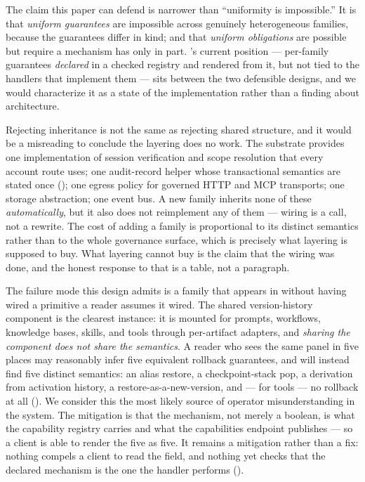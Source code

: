  The claim this paper can defend is narrower than
``uniformity is impossible.'' It is that \emph{uniform guarantees} are impossible
across genuinely heterogeneous families, because the guarantees differ in kind; and
that \emph{uniform obligations} are possible but require a mechanism \sys has only
in part. \sys's current position --- per-family guarantees \emph{declared} in a
checked registry and rendered from it, but not tied to the handlers that implement
them --- sits between the two defensible designs, and we would characterize it as a
state of the implementation rather than a finding about architecture.



 Rejecting inheritance is not the same as
rejecting shared structure, and it would be a misreading to conclude the layering
does no work. The substrate provides one implementation of session verification and
scope resolution that every account route uses; one audit-record helper whose
transactional semantics are stated once (); one egress
policy for governed HTTP and MCP transports; one storage abstraction; one event
bus. A new family inherits none of these \emph{automatically}, but it also does not
reimplement any of them --- wiring is a call, not a rewrite. The cost of adding a
family is proportional to its distinct semantics rather than to the whole
governance surface, which is precisely what layering is supposed to buy. What
layering cannot buy is the claim that the wiring was done, and the honest response
to that is a table, not a paragraph.

 The failure mode this design admits is a family
that appears in \Lfam{} without having wired a primitive a reader assumes it wired.
The shared version-history component is the clearest instance: it is mounted for
prompts, workflows, knowledge bases, skills, and tools through per-artifact
adapters, and \emph{sharing the component does not share the semantics}. A reader
who sees the same panel in five places may reasonably infer five equivalent
rollback guarantees, and will instead find five distinct semantics: an alias
restore, a checkpoint-stack pop, a derivation from activation history, a
restore-as-a-new-version, and --- for tools --- no rollback at all
(). We consider this the most likely source of operator
misunderstanding in the system. The mitigation is that the mechanism, not merely a
boolean, is what the capability registry carries and what the capabilities endpoint
publishes --- so a client is able to render the five as five. It remains a
mitigation rather than a fix: nothing compels a client to read the field, and
nothing yet checks that the declared mechanism is the one the handler performs
().


